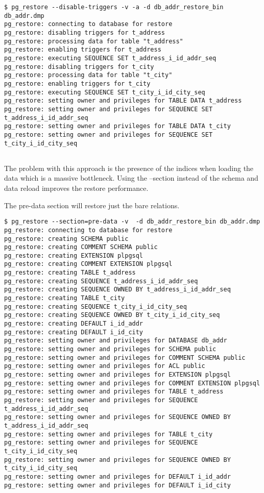 \begin{verbatim}
$ pg_restore --disable-triggers -v -a -d db_addr_restore_bin db_addr.dmp 
pg_restore: connecting to database for restore
pg_restore: disabling triggers for t_address
pg_restore: processing data for table "t_address"
pg_restore: enabling triggers for t_address
pg_restore: executing SEQUENCE SET t_address_i_id_addr_seq
pg_restore: disabling triggers for t_city
pg_restore: processing data for table "t_city"
pg_restore: enabling triggers for t_city
pg_restore: executing SEQUENCE SET t_city_i_id_city_seq
pg_restore: setting owner and privileges for TABLE DATA t_address
pg_restore: setting owner and privileges for SEQUENCE SET t_address_i_id_addr_seq
pg_restore: setting owner and privileges for TABLE DATA t_city
pg_restore: setting owner and privileges for SEQUENCE SET t_city_i_id_city_seq
 
\end{verbatim}

The problem with this approach is the presence of the indices when loading the data which is a massive 
bottleneck. Using the --section instead of the schema and data reload improves the restore 
performance.\newline

The pre-data section will restore just the bare relations.
\begin{verbatim}
$ pg_restore --section=pre-data -v  -d db_addr_restore_bin db_addr.dmp 
pg_restore: connecting to database for restore
pg_restore: creating SCHEMA public
pg_restore: creating COMMENT SCHEMA public
pg_restore: creating EXTENSION plpgsql
pg_restore: creating COMMENT EXTENSION plpgsql
pg_restore: creating TABLE t_address
pg_restore: creating SEQUENCE t_address_i_id_addr_seq
pg_restore: creating SEQUENCE OWNED BY t_address_i_id_addr_seq
pg_restore: creating TABLE t_city
pg_restore: creating SEQUENCE t_city_i_id_city_seq
pg_restore: creating SEQUENCE OWNED BY t_city_i_id_city_seq
pg_restore: creating DEFAULT i_id_addr
pg_restore: creating DEFAULT i_id_city
pg_restore: setting owner and privileges for DATABASE db_addr
pg_restore: setting owner and privileges for SCHEMA public
pg_restore: setting owner and privileges for COMMENT SCHEMA public
pg_restore: setting owner and privileges for ACL public
pg_restore: setting owner and privileges for EXTENSION plpgsql
pg_restore: setting owner and privileges for COMMENT EXTENSION plpgsql
pg_restore: setting owner and privileges for TABLE t_address
pg_restore: setting owner and privileges for SEQUENCE t_address_i_id_addr_seq
pg_restore: setting owner and privileges for SEQUENCE OWNED BY t_address_i_id_addr_seq
pg_restore: setting owner and privileges for TABLE t_city
pg_restore: setting owner and privileges for SEQUENCE t_city_i_id_city_seq
pg_restore: setting owner and privileges for SEQUENCE OWNED BY t_city_i_id_city_seq
pg_restore: setting owner and privileges for DEFAULT i_id_addr
pg_restore: setting owner and privileges for DEFAULT i_id_city
 
\end{verbatim}

